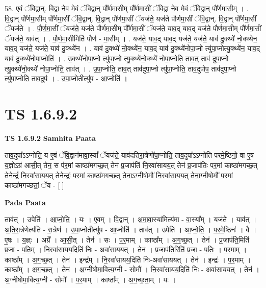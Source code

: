 \documentclass[17pt]{extarticle}
\begin{document}
58. ए॒वं ॅवि॒द्वान्. वि॒द्वा ने॒व मे॒वं ॅवि॒द्वान् पौ᳚र्णमा॒सीम् पौ᳚र्णमा॒सीं ॅवि॒द्वा ने॒व मे॒वं ॅवि॒द्वान् पौ᳚र्णमा॒सीम् । . वि॒द्वान् पौ᳚र्णमा॒सीम् पौ᳚र्णमा॒सीं ॅवि॒द्वान्. वि॒द्वान् पौ᳚र्णमा॒सीं ॅयज॑ते॒ यज॑ते पौर्णमा॒सीं ॅवि॒द्वान्. वि॒द्वान् पौ᳚र्णमा॒सीं ॅयज॑ते । . पौ॒र्ण॒मा॒सीं ॅयज॑ते॒ यज॑ते पौर्णमा॒सीम् पौ᳚र्णमा॒सीं ॅयज॑ते॒ याव॒द् याव॒द् यज॑ते पौर्णमा॒सीम् पौ᳚र्णमा॒सीं ॅयज॑ते॒ याव॑त् । . पौ॒र्ण॒मा॒सीमिति॑ पौर्ण - मा॒सीम् । . यज॑ते॒ याव॒द् याव॒द् यज॑ते॒ यज॑ते॒ याव॑ दु॒क्थ्ये॑ नो॒क्थ्ये॑न॒ याव॒द् यज॑ते॒ यज॑ते॒ याव॑ दु॒क्थ्ये॑न । . याव॑ दु॒क्थ्ये॑ नो॒क्थ्ये॑न॒ याव॒द् याव॑ दु॒क्थ्ये॑नोपा॒प्नो त्यु॑पा॒प्नोत्यु॒क्थ्ये॑न॒ याव॒द् याव॑ दु॒क्थ्ये॑नोपा॒प्नोति॑ । . उ॒क्थ्ये॑नोपा॒प्नो त्यु॑पा॒प्नो त्यु॒क्थ्ये॑नो॒क्थ्ये॑ नोपा॒प्नोति॒ ताव॒त् ताव॑ दुपा॒प्नो त्यु॒क्थ्ये॑नो॒क्थ्ये॑ नोपा॒प्नोति॒ ताव॑त् । . उ॒पा॒प्नोति॒ ताव॒त् ताव॑दुपा॒प्नो त्यु॑पा॒प्नोति॒ ताव॒दुपोप॒ ताव॑दुपा॒प्नो त्यु॑पा॒प्नोति॒ ताव॒दुप॑ । . उ॒पा॒प्नोतीत्यु॑प - आ॒प्नोति॑ । \newline
\pagebreak
{}
\section*{ TS 1.6.9.2 }

\textbf{TS 1.6.9.2 } \newline
\textbf{Samhita Paata} \newline

ताव॒दुपा᳚ऽऽप्नोति॒ य ए॒वं ॅवि॒द्वान॑मावा॒स्यां᳚ ॅयज॑ते॒ याव॑दतिरा॒त्रेणो॑पा॒प्नोति॒ ताव॒दुपा᳚ऽऽप्नोति परमे॒ष्ठिनो॒ वा ए॒ष य॒ज्ञोऽग्र॑ आसी॒त् तेन॒ स प॑र॒मां काष्ठा॑मगच्छ॒त् तेन॑ प्र॒जाप॑तिं नि॒रवा॑सायय॒त् तेन॑ प्र॒जाप॑तिः पर॒मां काष्ठा॑मगच्छ॒त् तेनेन्द्रं॑ नि॒रवा॑सायय॒त् तेनेन्द्रः॑ पर॒मां काष्ठा॑मगच्छ॒त् तेना॒ऽग्नीषोमौ॑ नि॒रवा॑सायय॒त् तेना॒ग्नीषोमौ॑ प॒रमां काष्ठा॑मगच्छतां॒ ॅय - [ ] \newline

\textbf{Pada Paata} \newline

ताव॑त् । उपेति॑ । आ॒प्नो॒ति॒ । यः । ए॒वम् । वि॒द्वान् । अ॒मा॒वा॒स्या॑मित्य॑मा - वा॒स्या᳚म् । यज॑ते । याव॑त् । अ॒ति॒रा॒त्रेणेत्य॑ति - रा॒त्रेण॑ । उ॒पा॒प्नोतीत्यु॑प - आ॒प्नोति॑ । ताव॑त् । उपेति॑ । आ॒प्नो॒ति॒ । प॒र॒मे॒ष्ठिनः॑ । वै । ए॒षः । य॒ज्ञ्ः । अग्रे᳚ । आ॒सी॒त् । तेन॑ । सः । प॒र॒माम् । काष्ठा᳚म् । अ॒ग॒च्छ॒त् । तेन॑ । प्र॒जाप॑ति॒मिति॑ प्र॒जा - प॒ति॒म् । नि॒रवा॑सायय॒दिति॑ निः - अवा॑साययत् । तेन॑ । प्र॒जाप॑ति॒रिति॑ प्र॒जा - प॒तिः॒ । प॒र॒माम् । काष्ठा᳚म् । अ॒ग॒च्छ॒त् । तेन॑ । इन्द्र᳚म् । नि॒रवा॑सायय॒दिति॑ निः-अवा॑साययत् । तेन॑ । इन्द्रः॑ । प॒र॒माम् । काष्ठा᳚म् । अ॒ग॒च्छ॒त् । तेन॑ । अ॒ग्नीषोमा॒वित्य॒ग्नी - सोमौ᳚ । नि॒रवा॑सायय॒दिति॑ निः - अवा॑साययत् । तेन॑ । अ॒ग्नीषोमा॒वित्य॒ग्नी - सोमौ᳚ । प॒र॒माम् । काष्ठा᳚म् । अ॒ग॒च्छ॒ता॒म् । यः ।  \newline
\end{document}
